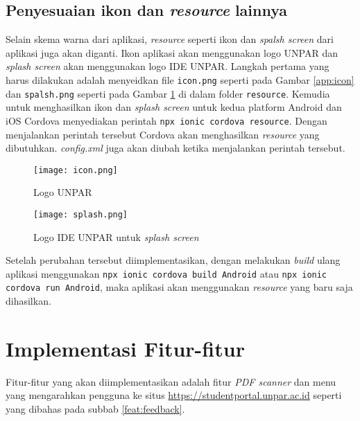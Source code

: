 \subsection{Penyesuaian ikon dan \textit{resource} lainnya}
Selain skema warna dari aplikasi, \textit{resource} seperti ikon dan \textit{spalsh screen} dari aplikasi juga akan diganti. Ikon aplikasi akan menggunakan logo UNPAR dan \textit{splash screen} akan menggunakan logo IDE UNPAR. Langkah pertama yang harus dilakukan adalah menyeidkan file \texttt{icon.png} seperti pada Gambar \ref{app:icon} dan \texttt{spalsh.png} seperti pada Gambar \ref{app:splash} di dalam folder \texttt{resource}. Kemudia untuk menghasilkan ikon dan \textit{splash screen} untuk kedua platform Android dan iOS Cordova menyediakan perintah \texttt{npx ionic cordova resource}. Dengan menjalankan perintah tersebut Cordova akan menghasilkan \textit{resource} yang dibutuhkan. \textit{config.xml} juga akan diubah ketika menjalankan perintah tersebut.

\begin{figure}[H] 
\begin{minipage}{.5\textwidth}
	\centering  
	\texttt{[image: icon.png]}  
	\caption[Logo  UNPAR] {Logo  UNPAR} 
	\label{app:icon}
\end{minipage}
\begin{minipage}{.5\textwidth}
	\centering  
	\texttt{[image: splash.png]}  
	\caption[Logo IDE UNPAR untuk \textit{splash screen}] {Logo IDE UNPAR untuk \textit{splash screen}} 
	\label{app:splash} 
\end{minipage}
\end{figure} 




Setelah perubahan tersebut diimplementasikan, dengan melakukan \textit{build} ulang aplikasi menggunakan \texttt{npx ionic cordova build Android} atau \texttt{npx ionic cordova run Android}, maka aplikasi akan menggunakan \textit{resource} yang baru saja dihasilkan.

\section{Implementasi Fitur-fitur}
Fitur-fitur yang akan diimplementasikan adalah fitur \textit{PDF scanner} dan menu yang mengarahkan pengguna ke situs \url{https://studentportal.unpar.ac.id} seperti yang dibahas pada subbab \ref{feat:feedback}.%

